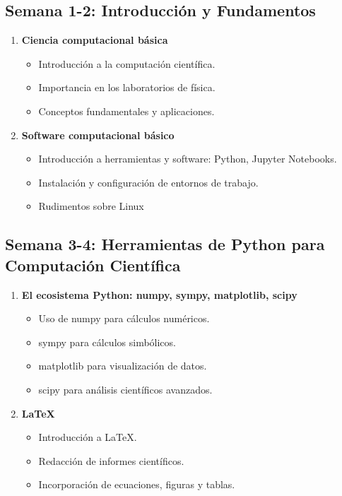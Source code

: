 \documentclass{article}
\begin{document}
\subsection*{Semana 1-2: Introducción y Fundamentos}
\begin{enumerate}
    \item \textbf{Ciencia computacional básica}
    \begin{itemize}
        \item Introducción a la computación científica.
        \item Importancia en los laboratorios de física.
        \item Conceptos fundamentales y aplicaciones.
    \end{itemize}
    \item \textbf{Software computacional básico}
    \begin{itemize}
        \item Introducción a herramientas y software: Python, Jupyter Notebooks.
        \item Instalación y configuración de entornos de trabajo.
        \item Rudimentos sobre Linux
    \end{itemize}
\end{enumerate}

\subsection*{Semana 3-4: Herramientas de Python para Computación Científica}
\begin{enumerate}
    \item \textbf{El ecosistema Python: numpy, sympy, matplotlib, scipy}
    \begin{itemize}
        \item Uso de numpy para cálculos numéricos.
        \item sympy para cálculos simbólicos.
        \item matplotlib para visualización de datos.
        \item scipy para análisis científicos avanzados.
    \end{itemize}
    \item \textbf{LaTeX}
    \begin{itemize}
        \item Introducción a LaTeX.
        \item Redacción de informes científicos.
        \item Incorporación de ecuaciones, figuras y tablas.
    \end{itemize}
\end{enumerate}
\end{document}
